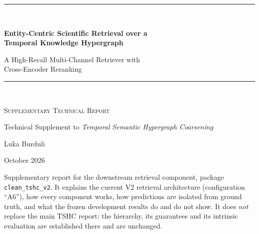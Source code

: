 \documentclass[11pt,a4paper]{article}
\theoremstyle{remark}
\newcommand{\code}[1]{\texttt{\small #1}}
\begin{document}

\hypersetup{pageanchor=false}
\begin{titlepage}
\centering
\vspace*{2.2cm}
{\color{accent}\rule{\linewidth}{1.2pt}}\\[0.8cm]
{\huge\bfseries Entity-Centric Scientific Retrieval over a\\[4pt] Temporal Knowledge Hypergraph\par}
\vspace{0.5cm}
{\Large A High-Recall Multi-Channel Retriever with\\ Cross-Encoder Reranking\par}
\vspace{0.6cm}
{\color{accent}\rule{\linewidth}{1.2pt}}\\[1.3cm]
{\large\textsc{Supplementary Technical Report}\par}
\vspace{0.25cm}
{\large Technical Supplement to \emph{Temporal Semantic Hypergraph Coarsening}\par}
\vspace{2.0cm}
{\Large Luka Burduli\par}
\vspace{0.4cm}
{\large October 2026\par}
\vfill
\begin{minipage}{0.84\linewidth}
\small\centering
Supplementary report for the downstream retrieval component, package
\code{clean\_tshc\_v2}. It explains the current V2 retrieval architecture
(configuration ``A6''), how every component works, how predictions are isolated from
ground truth, and what the frozen development results do and do not show.
It does \emph{not} replace the main TSHC report: the hierarchy, its guarantees and its
intrinsic evaluation are established there and are unchanged.
\end{minipage}
\vspace{1.5cm}
\end{titlepage}
\hypersetup{pageanchor=true}
\end{document}
